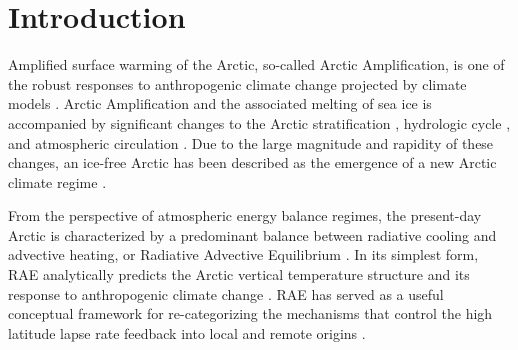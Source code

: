 \documentclass[draft]{agujournal2019}
\begin{document}

%
%
%
%


\section{Introduction}

Amplified surface warming of the Arctic, so-called Arctic Amplification, is one of the robust responses to anthropogenic climate change projected by climate models \cite{manabe1975, held1993a, vallis2015}. Arctic Amplification and the associated melting of sea ice is accompanied by significant changes to the Arctic stratification \cite{manabe1975, bintanja2014}, hydrologic cycle \cite{bintanja2017, siler2018, pithan2021}, and atmospheric circulation \cite{deser2010}. Due to the large magnitude and rapidity of these changes, an ice-free Arctic has been described as the emergence of a new Arctic climate regime \cite{serreze2006, landrum2020}.

From the perspective of atmospheric energy balance regimes, the present-day Arctic is characterized by a predominant balance between radiative cooling and advective heating, or Radiative Advective Equilibrium \cite<RAE,>[]{nakamura1988, cronin2016, miyawaki2022}. In its simplest form, RAE analytically predicts the Arctic vertical temperature structure \cite{cronin2016} and its response to anthropogenic climate change \cite{payne2015}. RAE has served as a useful conceptual framework for re-categorizing the mechanisms that control the high latitude lapse rate feedback into local and remote origins \cite{feldl2020}.
\end{document}
